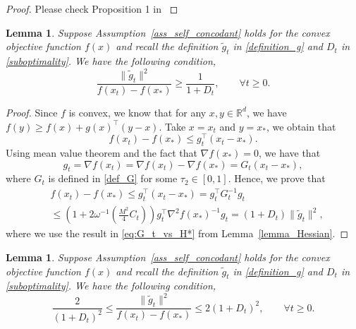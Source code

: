 \documentclass[11pt,letterpaper]{article}
\newcommand\0{{\Vector{0}}}
\newcommand\1{{\Vector{1}}}
\newtheorem{lemma}[theorem]{Lemma}
\numberwithin{assumption}{section}
\numberwithin{definition}{section}
\numberwithin{theorem}{section}
\numberwithin{remark}{section}
\begin{document}
\begin{proof}
Please check Proposition 1 in \cite{jin2024non}
\end{proof}

\begin{lemma}\label{lemma_g}
    Suppose Assumption~\ref{ass_self_concodant} holds for the convex objective function $f(x)$ and recall the definition $\tilde{g}_t$ in \eqref{definition_g} and $D_t$ in \eqref{suboptimality}. We have the following condition,
    \begin{equation}
        \frac{\|\tilde{g}_t\|^2}{f(x_t) - f(x_*)} \geq \frac{1}{1 + D_t}, \qquad \forall t \geq 0.
    \end{equation}
\end{lemma}

\begin{proof}
    Since $f$ is convex, we know that for any $x, y \in \mathbb{R}^d$, we have $f(y) \geq f(x) + g(x)^\top(y - x)$. Take  $x = x_t$ and $y = x_*$, we obtain that
    \begin{equation*}
        f(x_t) - f(x_*) \leq g_t^\top(x_t - x_*).
    \end{equation*}
    Using mean value theorem and the fact that $\nabla{f(x_*)} = 0$, we have that
    \begin{equation*}
        g_t = \nabla{f(x_t)} = \nabla{f(x_t)} - \nabla{f(x_*)} = G_t(x_t - x_*),
    \end{equation*}
    where $G_t$ is defined in \eqref{def_G} for some $\tau_2 \in [0, 1]$. Hence, we prove that
    \begin{equation*}
    \begin{split}
        & f(x_t) - f(x_*) \leq g_t^\top(x_t - x_*) = g_t^\top G_t^{-1}g_t \\
        & \leq \left(1 + 2\omega^{-1}(\frac{M^2}{4}C_t)\right)g_t^\top \nabla^2{f(x_*)}^{-1}g_t = \left(1 + D_t\right)\|\tilde{g}_t\|^2,
    \end{split}
    \end{equation*}
    where we use the result in \eqref{eq:G_t_vs_H*} from Lemma~\ref{lemma_Hessian}.
\end{proof}

\begin{lemma}\label{lemma_eigenvalue}
    Suppose Assumption~\ref{ass_self_concodant} holds for the convex objective function $f(x)$ and recall the definition $\tilde{g}_t$ in \eqref{definition_g} and $D_t$ in \eqref{suboptimality}. We have the following condition,
    \begin{equation}
        \frac{2}{(1 + D_t)^2} \leq \frac{\|\tilde{g}_t\|^2}{f(x_t) - f(x_*)} \leq 2(1 + D_t)^2, \qquad \forall t \geq 0.
    \end{equation}
\end{lemma}
\end{document}
